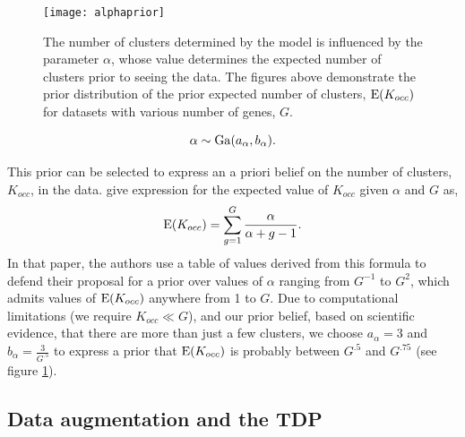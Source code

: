 \begin{figure}
\texttt{[image: alphaprior]}
\caption{The number of clusters determined by the model is influenced by the parameter $\alpha$, whose value determines the expected number of clusters prior to seeing the data. The figures above demonstrate the prior distribution of the prior expected number of clusters, $\operatorname{E}(K_{occ})$ for datasets with various number of genes, $G$.}
\label{alphaprior}
\end{figure}

\begin{equation}
\alpha \sim \operatorname{Ga}(a_\alpha,b_\alpha).
\end{equation}

This prior can be selected to express an a priori belief on the number of clusters, $K_{occ}$, in the data. \citet{escobar1994} give expression for the expected value of $K_{occ}$ given $\alpha$ and $G$ as,
\begin{equation}
\operatorname{E}(K_{occ})=\sum_{g=1}^{G} \frac{\alpha}{\alpha + g - 1}.
\end{equation}
In that paper, the authors use a table of values derived from this formula to defend their proposal for a prior over values of $\alpha$ ranging from $G^{-1}$ to $G^{2}$, which admits values of $\operatorname{E}(K_{occ})$ anywhere from 1 to $G$. Due to computational limitations (we require $K_{occ} \ll G$), and our prior belief, based on scientific evidence, that there are more than just a few clusters, we choose $a_\alpha=3$ and $b_\alpha=\frac{3}{G^{.5}}$ to express a prior that $\operatorname{E}(K_{occ})$ is probably between $G^{.5}$ and $G^{.75}$ (see figure \ref{alphaprior}).

\subsection{Data augmentation and the TDP}
\label{subsec:reparam}

